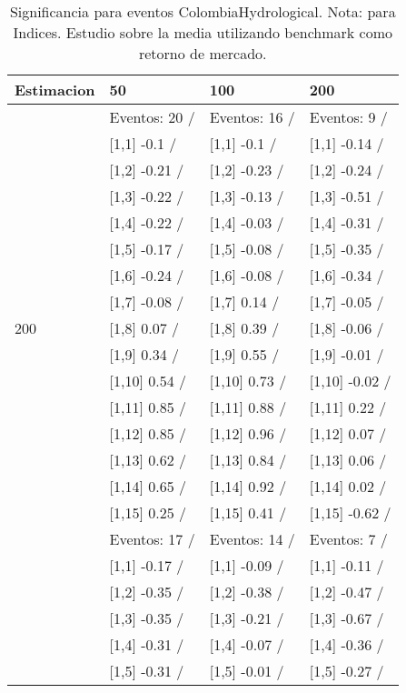 \begin{table}

\caption{Significancia para eventos ColombiaHydrological. Nota: para Indices. Estudio sobre la media utilizando benchmark como retorno de mercado.}
\centering
\begin{tabular}[t]{llll}
\toprule
Estimacion & 50 & 100 & 200\\
\midrule
 & Eventos:  20 / & Eventos:  16 / & Eventos:  9 /\\
 & {}[1,1] -0.1  / & {}[1,1] -0.1  / & {}[1,1] -0.14  /\\
 & {}[1,2] -0.21  / & {}[1,2] -0.23  / & {}[1,2] -0.24  /\\
 & {}[1,3] -0.22  / & {}[1,3] -0.13  / & {}[1,3] -0.51  /\\
 & {}[1,4] -0.22  / & {}[1,4] -0.03  / & {}[1,4] -0.31  /\\
\addlinespace
 & {}[1,5] -0.17  / & {}[1,5] -0.08  / & {}[1,5] -0.35  /\\
 & {}[1,6] -0.24  / & {}[1,6] -0.08  / & {}[1,6] -0.34  /\\
 & {}[1,7] -0.08  / & {}[1,7] 0.14  / & {}[1,7] -0.05  /\\
200 & {}[1,8] 0.07  / & {}[1,8] 0.39  / & {}[1,8] -0.06  /\\
 & {}[1,9] 0.34  / & {}[1,9] 0.55  / & {}[1,9] -0.01  /\\
\addlinespace
 & {}[1,10] 0.54  / & {}[1,10] 0.73  / & {}[1,10] -0.02  /\\
 & {}[1,11] 0.85  / & {}[1,11] 0.88  / & {}[1,11] 0.22  /\\
 & {}[1,12] 0.85  / & {}[1,12] 0.96  / & {}[1,12] 0.07  /\\
 & {}[1,13] 0.62  / & {}[1,13] 0.84  / & {}[1,13] 0.06  /\\
 & {}[1,14] 0.65  / & {}[1,14] 0.92  / & {}[1,14] 0.02  /\\
\addlinespace
 & {}[1,15] 0.25  / & {}[1,15] 0.41  / & {}[1,15] -0.62  /\\
 & Eventos:  17 / & Eventos:  14 / & Eventos:  7 /\\
 & {}[1,1] -0.17  / & {}[1,1] -0.09  / & {}[1,1] -0.11  /\\
 & {}[1,2] -0.35  / & {}[1,2] -0.38  / & {}[1,2] -0.47  /\\
 & {}[1,3] -0.35  / & {}[1,3] -0.21  / & {}[1,3] -0.67  /\\
\addlinespace
 & {}[1,4] -0.31  / & {}[1,4] -0.07  / & {}[1,4] -0.36  /\\
 & {}[1,5] -0.31  / & {}[1,5] -0.01  / & {}[1,5] -0.27  /\\

\end{tabular}
\end{table}
